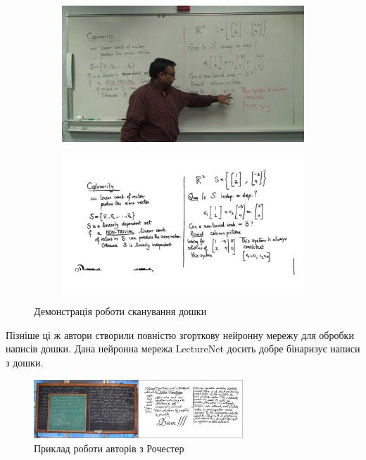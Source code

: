 \begin{figure}[H]
  \centering
  \begin{subfigure}[b]{0.35\textwidth}
    \centering
    \includegraphics[width=\textwidth]{images/davila_2017_1}
  \end{subfigure}
  \begin{subfigure}[b]{0.35\textwidth}
    \centering
    \includegraphics[width=\textwidth]{images/davila_2017_2}
  \end{subfigure}
  \caption{Демонстрація роботи сканування дошки \cite{davila:2017}
    \label{fig:davila:2017}
  }
\end{figure}

Пізніше ці ж автори створили повністю згорткову нейронну мережу \cite{davila:2021}
для обробки написів дошки. Дана нейронна мережа LectureNet досить добре бінаризує написи з дошки.

\begin{figure}[H]
  \centering
  \includegraphics[width=0.7\textwidth]{images/davila_2021}
  \caption{Приклад роботи авторів з Рочестер}
  \label{fig:davila:2021}
\end{figure}

\clearpage